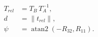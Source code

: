 \begin{align*}
    T_{rel} &= T_B\, T_A^{-1},\\
    d &= \|t_{rel}\|,\\
    \psi &= \operatorname{atan2}(-R_{32}, R_{11}).
\end{align*}

